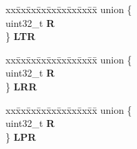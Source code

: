 \begin{DoxyCompactItemize}
\begin{tabbing}
\end{tabbing}\item 
\mbox{\label{structESCI__tag_a4a2ce6261bcabb9d12b224c4b000459e}} 
\begin{tabbing}
xx\=xx\=xx\=xx\=xx\=xx\=xx\=xx\=xx\=\kill
union \{\\
\>uint32\_t {\bfseries R}\\
\} {\bfseries LTR}\\

\end{tabbing}\item 
\mbox{\label{structESCI__tag_a9e12db795364188a11738f28f1d3f403}} 
\begin{tabbing}
xx\=xx\=xx\=xx\=xx\=xx\=xx\=xx\=xx\=\kill
union \{\\
\>uint32\_t {\bfseries R}\\
\} {\bfseries LRR}\\

\end{tabbing}\item 
\mbox{\label{structESCI__tag_a21c39c3deb7ef9080e517a6e0cdf7997}} 
\begin{tabbing}
xx\=xx\=xx\=xx\=xx\=xx\=xx\=xx\=xx\=\kill
union \{\\
\>uint32\_t {\bfseries R}\\
\} {\bfseries LPR}\\


\end{tabbing}
\end{DoxyCompactItemize}
